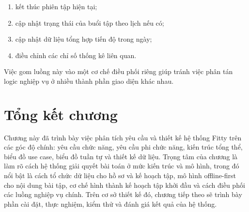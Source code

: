 \begin{enumerate}
    \item kết thúc phiên tập hiện tại;
    \item cập nhật trạng thái của buổi tập theo lịch nếu có;
    \item cập nhật dữ liệu tổng hợp tiến độ trong ngày;
    \item điều chỉnh các chỉ số thống kê liên quan.
\end{enumerate}

Việc gom luồng này vào một cơ chế điều phối riêng giúp tránh việc phân tán logic nghiệp vụ ở nhiều thành phần giao diện khác nhau.

\section{Tổng kết chương}

Chương này đã trình bày việc phân tích yêu cầu và thiết kế hệ thống Fitty trên các góc độ chính: yêu cầu chức năng, yêu cầu phi chức năng, kiến trúc tổng thể, biểu đồ use case, biểu đồ tuần tự và thiết kế dữ liệu. Trọng tâm của chương là làm rõ cách hệ thống giải quyết bài toán ở mức kiến trúc và mô hình, trong đó nổi bật là cách tổ chức dữ liệu cho hồ sơ và kế hoạch tập, mô hình offline-first cho nội dung bài tập, cơ chế hình thành kế hoạch tập khởi đầu và cách điều phối các luồng nghiệp vụ chính. Trên cơ sở thiết kế đó, chương tiếp theo sẽ trình bày phần cài đặt, thực nghiệm, kiểm thử và đánh giá kết quả của hệ thống.








